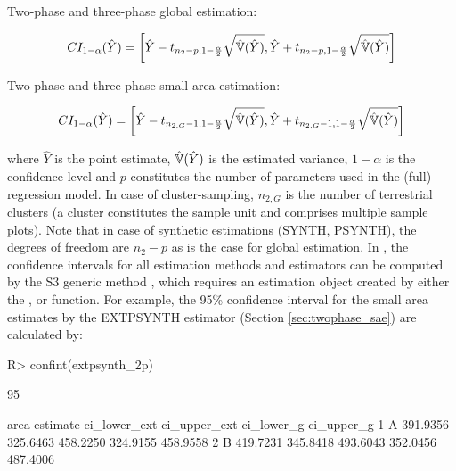 Two-phase and three-phase global estimation:

\begin{equation}\label{ci_2phase_global}
CI_{1-\alpha}(\hat{Y})=\bigg{\lbrack}\hat{Y}-t_{n_{2}-p, 1-\frac{\alpha}{2}}\sqrt{\hat{\mathbb{V}}(\hat{Y})},
                              \hat{Y}+t_{n_{2}-p, 1-\frac{\alpha}{2}}\sqrt{\hat{\mathbb{V}}(\hat{Y})}\bigg{\rbrack}
\end{equation}

Two-phase and three-phase small area estimation:

\begin{equation}\label{ci_2phase_sae}
CI_{1-\alpha}(\hat{Y})=\bigg{\lbrack}\hat{Y}-t_{n_{2,G}-1, 1-\frac{\alpha}{2}}\sqrt{\hat{\mathbb{V}}(\hat{Y})},
                              \hat{Y}+t_{n_{2,G}-1, 1-\frac{\alpha}{2}}\sqrt{\hat{\mathbb{V}}(\hat{Y})}\bigg{\rbrack}
\end{equation}

\vspace{4mm}

where $\hat{Y}$ is the point estimate, $\hat{\mathbb{V}}(\hat{Y})$ is the estimated variance, $1-\alpha$ is the confidence level and $p$ constitutes the number of parameters used in the (full) regression model. In case of cluster-sampling, $n_{2,G}$ is the number of terrestrial clusters (a cluster constitutes the sample unit and comprises multiple sample plots). Note that in case of synthetic estimations (SYNTH, PSYNTH), the degrees of freedom are $n_{2}-p$ as is the case for global estimation. In , the confidence intervals for all estimation methods and estimators can be computed by the S3 generic method , which requires an estimation object created by either the ,  or  function. For example, the 95\% confidence interval for the small area estimates by the EXTPSYNTH estimator (Section \ref{sec:twophase_sae}) are calculated by:

\begin{small}
\begin{Schunk}
\begin{Sinput}
R> confint(extpsynth_2p)
\end{Sinput}
\begin{Soutput}
95%
 
  area estimate ci_lower_ext ci_upper_ext ci_lower_g ci_upper_g
1    A 391.9356     325.6463     458.2250   324.9155   458.9558
2    B 419.7231     345.8418     493.6043   352.0456   487.4006
\end{Soutput}
\end{Schunk}
\end{small}



